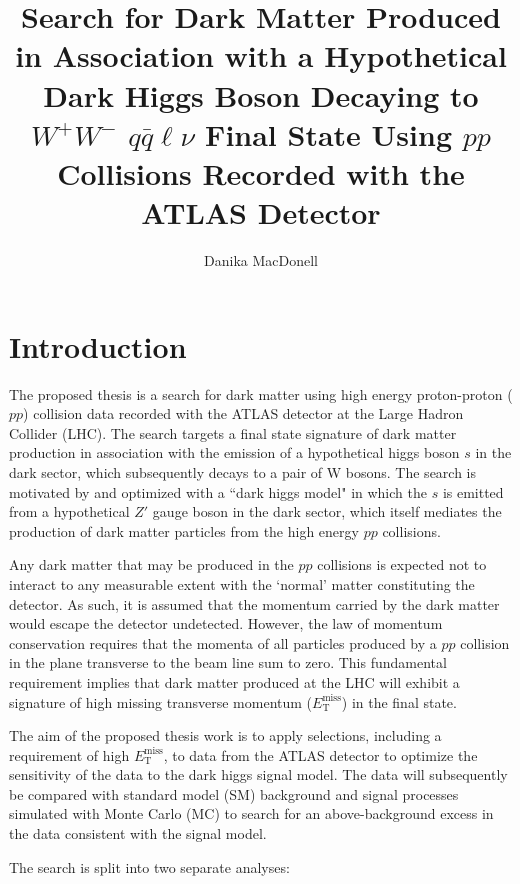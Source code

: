 \documentclass[12pt]{article}
\author{Danika MacDonell}
\title{Search for Dark Matter Produced in Association with a Hypothetical Dark Higgs Boson Decaying to $W^+W^-$ $q\bar{q}\ell\nu$ Final State Using $pp$ Collisions Recorded with the ATLAS Detector}
\newcommand*{\met}{\ensuremath{E_\text{T}^\text{miss}}}
\begin{document}
\maketitle

\section{Introduction}

The proposed thesis is a search for dark matter using high energy proton-proton ($pp$) collision data recorded with the ATLAS detector at the Large Hadron Collider (LHC). The search targets a final state signature of dark matter production in association with the emission of a hypothetical higgs boson $s$ in the dark sector, which subsequently decays to a pair of W bosons. The search is motivated by and optimized with a ``dark higgs model" \cite{dark_higgs} in which the $s$ is emitted from a hypothetical $Z'$ gauge boson in the dark sector, which itself mediates the production of dark matter particles from the high energy $pp$ collisions. 

Any dark matter that may be produced in the $pp$ collisions is expected not to interact to any measurable extent with the `normal' matter constituting the detector. As such, it is assumed that the momentum carried by the dark matter would escape the detector undetected. However, the law of momentum conservation requires that the momenta of all particles produced by a $pp$ collision in the plane transverse to the beam line sum to zero. This fundamental requirement implies that dark matter produced at the LHC will exhibit a signature of high missing transverse momentum (\met) in the final state. 

The aim of the proposed thesis work is to apply selections, including a requirement of high \met, to data from the ATLAS detector to optimize the sensitivity of the data to the dark higgs signal model. The data will subsequently be compared with standard model (SM) background and signal processes simulated with Monte Carlo (MC) to search for an above-background excess in the data consistent with the signal model. 

The search is split into two separate analyses:
\end{document}
